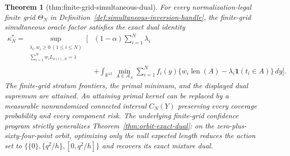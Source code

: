 \documentclass{article}
\newtheorem{theorem}{Theorem}
\begin{document}
\begin{theorem}[thm:finite-grid-simultaneous-dual]\label{thm:finite-grid-simultaneous-dual}
For every normalization-legal finite grid \(\Theta_N\) in Definition~\ref{def:simultaneous-inversion-handle}, the finite-grid simultaneous oracle factor satisfies the exact dual identity
\[
\begin{split}
 \kappa_N^*=\sup_{\substack{\lambda_i,w_i\geq0\ (1\leq i\leq N)\\
                 \sum_{i=1}^Nw_iL_{k(i),N}=1}}
 \bigg[&(1-\alpha)\sum_{i=1}^N\lambda_i\\
 &+\int_{\mathbb R^{12}}\min_{A\in\mathcal A_N}
 \sum_{i=1}^Nf_i(y)
 \{w_i\operatorname{len}(A)-\lambda_i\mathbf 1(t_i\in A)\}\,dy\bigg].
\end{split}
\]
The finite-grid stratum frontiers, the primal minimum, and the displayed dual supremum are attained.  An attaining primal kernel can be replaced by a measurable nonrandomized connected interval \(C_N(Y)\) preserving every coverage probability and every component risk.  The underlying finite-grid confidence program strictly generalizes Theorem~\ref{thm:orbit-exact-dual}: on the zero-plus-sixty-four-point orbit, optimizing only the null expected length reduces the action set to \(\{\{0\},\{q^2/h\},[0,q^2/h]\}\) and recovers its exact mixture dual.
\end{theorem}
\end{document}
